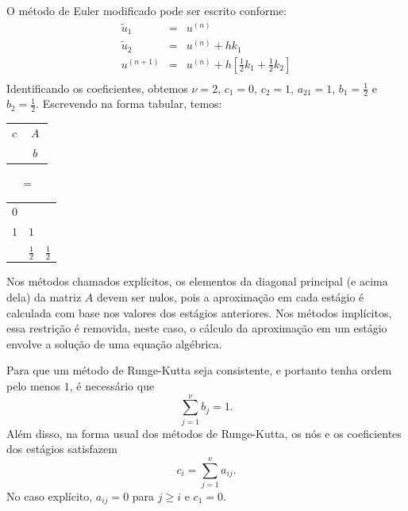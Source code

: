 \begin{ex} O método de Euler modificado pode ser escrito conforme:
\begin{eqnarray}
 \tilde{u}_1 &=& u^{(n)}\\
 \tilde{u}_2 &=& u^{(n)} + h k_1\\
 u^{(n+1)} &=& u^{(n)} + h \left[\frac{1}{2}k_1+\frac{1}{2}k_2\right]\\
  \end{eqnarray}
Identificando os coeficientes, obtemos $\nu=2$, $c_1=0$, $c_2=1$, $a_{21}=1$, $b_1=\frac{1}{2}$ e $b_2=\frac{1}{2}$. Escrevendo na forma tabular, temos:
\begin{center}
\begin{tabular}{c|cc}
  \multirow{2}{*}{$c$}    &  \multicolumn{2}{c}{\multirow{2}{*}{$A$}} 	     \\
                          &  \multicolumn{2}{c}{}                            \\
  \hline
                          & \multicolumn{2}{c}{$~~b~~$}
\end{tabular}
~~~=~~~
\begin{tabular}{c|cc}
  $0$ &   &   \\
  $1$ & $1$ &   \\  \hline
      & $\frac{1}{2}$ &$\frac{1}{2}$
\end{tabular}
\end{center}
\end{ex}

 \begin{obs}\label{obs:obs_imp} Nos métodos chamados explícitos, os elementos da diagonal principal (e acima dela) da matriz $A$ devem ser nulos, pois a aproximação em cada estágio é calculada com base nos valores dos estágios anteriores. Nos métodos implícitos, essa restrição é removida, neste caso, o cálculo da aproximação em um estágio envolve a solução de uma equação algébrica.
  \end{obs}

\begin{obs}
Para que um método de Runge-Kutta seja consistente, e portanto tenha ordem pelo menos $1$, é necessário que
\begin{equation}
\sum_{j=1}^{\nu}b_j=1.
\end{equation}
Além disso, na forma usual dos métodos de Runge-Kutta, os nós e os coeficientes dos estágios satisfazem
\begin{equation}
c_i=\sum_{j=1}^{\nu}a_{ij}.
\end{equation}
No caso explícito, $a_{ij}=0$ para $j\geq i$ e $c_1=0$.
\end{obs}


